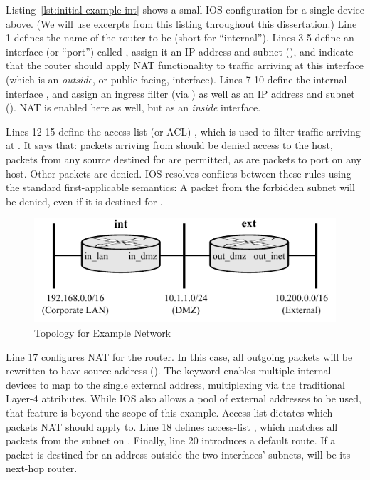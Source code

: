 Listing~\ref{lst:initial-example-int} shows a small IOS configuration for a single
device above. (We will use excerpts from this listing throughout this dissertation.)
Line 1 defines the name of the router to be  (short for
``internal''). Lines 3-5 define an interface (or ``port'') called ,
assign it an IP address and subnet (), and indicate
that the router should apply NAT functionality to traffic arriving at this interface
(which is an \emph{outside}, or public-facing, interface). Lines 7-10 define the internal
interface , and assign an ingress filter (via ) as
well as an IP address and subnet (). NAT is enabled here
as well, but as an \emph{inside} interface.

Lines 12-15 define the access-list (or ACL) , which is used to filter traffic
arriving at . It says that:  packets arriving from 
should be denied access to the  host, 
packets from any source destined for  are permitted, as are
 packets to port  on any host. Other packets are denied. IOS
resolves conflicts between these rules using the standard first-applicable
semantics: A packet from the forbidden subnet will be denied, even if it is
destined for .

\begin{figure}
  \centering
  \includegraphics[scale=1.25]{figs/orig_network.pdf}
  \caption{Topology for Example Network}
  \label{fig:orig-network}
\end{figure}

Line 17 configures NAT for the router. In this case, all outgoing packets will
be rewritten to have source address  ().
The  keyword enables multiple internal devices to map to the single
external address, multiplexing via the traditional Layer-4 attributes. While IOS also
allows a pool of external addresses to be used, that feature is beyond the
scope of this example. Access-list  dictates which packets NAT should
apply to. Line 18 defines access-list , which matches all packets from
the subnet on . Finally, line 20 introduces a default route.
If a packet is destined for an address outside the two interfaces'
subnets,  will be its next-hop router.

